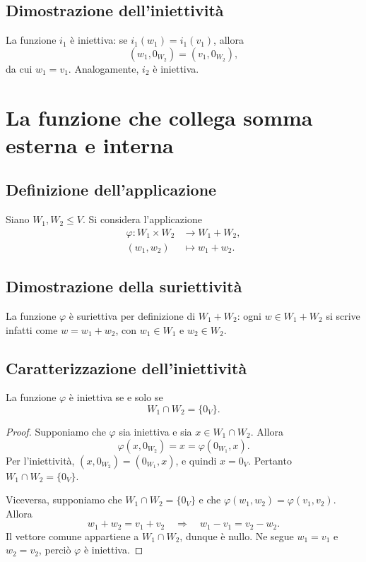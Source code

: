 \documentclass[11pt,a4paper]{article}
\theoremstyle{plain}
\theoremstyle{definition}
\theoremstyle{remark}
\begin{document}
\subsection{Dimostrazione dell'iniettività}

La funzione $i_1$ è iniettiva: se $i_1(w_1)=i_1(v_1)$, allora
\[
(w_1,0_{W_2})=(v_1,0_{W_2}),
\]
da cui $w_1=v_1$. Analogamente, $i_2$ è iniettiva.

\section{La funzione che collega somma esterna e interna}

\subsection{Definizione dell'applicazione}

Siano $W_1,W_2\leq V$. Si considera l'applicazione
\[
\begin{aligned}
\varphi:W_1\times W_2&\longrightarrow W_1+W_2,\\
(w_1,w_2)&\longmapsto w_1+w_2.
\end{aligned}
\]

\subsection{Dimostrazione della suriettività}

La funzione $\varphi$ è suriettiva per definizione di $W_1+W_2$: ogni
$w\in W_1+W_2$ si scrive infatti come $w=w_1+w_2$, con
$w_1\in W_1$ e $w_2\in W_2$.

\subsection{Caratterizzazione dell'iniettività}

La funzione $\varphi$ è iniettiva se e solo se
\[
W_1\cap W_2=\{0_V\}.
\]

\begin{proof}
Supponiamo che $\varphi$ sia iniettiva e sia $x\in W_1\cap W_2$.
Allora
\[
\varphi(x,0_{W_2})=x=\varphi(0_{W_1},x).
\]
Per l'iniettività, $(x,0_{W_2})=(0_{W_1},x)$, e quindi $x=0_V$.
Pertanto $W_1\cap W_2=\{0_V\}$.

Viceversa, supponiamo che $W_1\cap W_2=\{0_V\}$ e che
$\varphi(w_1,w_2)=\varphi(v_1,v_2)$. Allora
\[
w_1+w_2=v_1+v_2
\quad\Longrightarrow\quad
w_1-v_1=v_2-w_2.
\]
Il vettore comune appartiene a $W_1\cap W_2$, dunque è nullo.
Ne segue $w_1=v_1$ e $w_2=v_2$, perciò $\varphi$ è iniettiva.
\end{proof}
\end{document}
